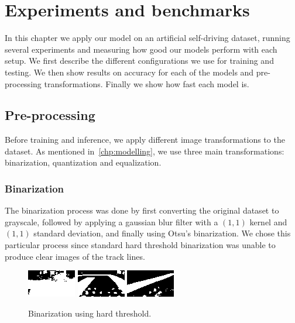 
\chapter{Experiments and benchmarks}\label{chp:benchmarks}

In this chapter we apply our model on an artificial self-driving dataset, running several
experiments and measuring how good our models perform with each setup. We first describe the
different configurations we use for training and testing. We then show results on accuracy for each
of the models and pre-processing transformations. Finally we show how fast each model is.

\section{Pre-processing}

Before training and inference, we apply different image transformations to the dataset. As
mentioned in~\autoref{chp:modelling}, we use three main transformations: binarization, quantization
and equalization.

\subsection{Binarization}

The binarization process was done by first converting the original dataset to grayscale, followed
by applying a gaussian blur filter with a $(1, 1)$ kernel and $(1, 1)$ standard deviation, and
finally using Otsu's binarization. We chose this particular process since standard hard threshold
binarization was unable to produce clear images of the track lines.

\begin{figure}[h]
  \centering
  \includegraphics[scale=1.75]{imgs/binary_left_h.png}
  \includegraphics[scale=1.75]{imgs/binary_up_h.png}
  \includegraphics[scale=1.75]{imgs/binary_right_h.png}
  \caption{Binarization using hard threshold.\label{fig:bin-hard}}
\end{figure}


